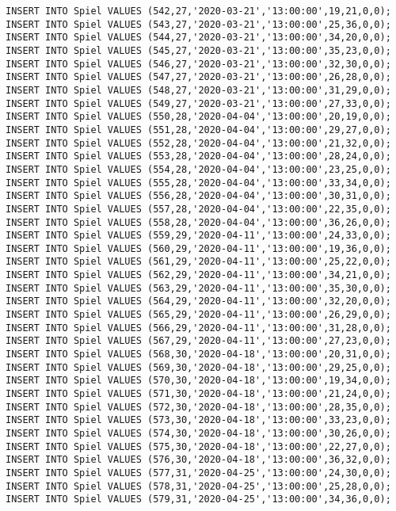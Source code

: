 \documentclass{bschlangaul-aufgabe}
\begin{document}
\begin{verbatim}
INSERT INTO Spiel VALUES (542,27,'2020-03-21','13:00:00',19,21,0,0);
INSERT INTO Spiel VALUES (543,27,'2020-03-21','13:00:00',25,36,0,0);
INSERT INTO Spiel VALUES (544,27,'2020-03-21','13:00:00',34,20,0,0);
INSERT INTO Spiel VALUES (545,27,'2020-03-21','13:00:00',35,23,0,0);
INSERT INTO Spiel VALUES (546,27,'2020-03-21','13:00:00',32,30,0,0);
INSERT INTO Spiel VALUES (547,27,'2020-03-21','13:00:00',26,28,0,0);
INSERT INTO Spiel VALUES (548,27,'2020-03-21','13:00:00',31,29,0,0);
INSERT INTO Spiel VALUES (549,27,'2020-03-21','13:00:00',27,33,0,0);
INSERT INTO Spiel VALUES (550,28,'2020-04-04','13:00:00',20,19,0,0);
INSERT INTO Spiel VALUES (551,28,'2020-04-04','13:00:00',29,27,0,0);
INSERT INTO Spiel VALUES (552,28,'2020-04-04','13:00:00',21,32,0,0);
INSERT INTO Spiel VALUES (553,28,'2020-04-04','13:00:00',28,24,0,0);
INSERT INTO Spiel VALUES (554,28,'2020-04-04','13:00:00',23,25,0,0);
INSERT INTO Spiel VALUES (555,28,'2020-04-04','13:00:00',33,34,0,0);
INSERT INTO Spiel VALUES (556,28,'2020-04-04','13:00:00',30,31,0,0);
INSERT INTO Spiel VALUES (557,28,'2020-04-04','13:00:00',22,35,0,0);
INSERT INTO Spiel VALUES (558,28,'2020-04-04','13:00:00',36,26,0,0);
INSERT INTO Spiel VALUES (559,29,'2020-04-11','13:00:00',24,33,0,0);
INSERT INTO Spiel VALUES (560,29,'2020-04-11','13:00:00',19,36,0,0);
INSERT INTO Spiel VALUES (561,29,'2020-04-11','13:00:00',25,22,0,0);
INSERT INTO Spiel VALUES (562,29,'2020-04-11','13:00:00',34,21,0,0);
INSERT INTO Spiel VALUES (563,29,'2020-04-11','13:00:00',35,30,0,0);
INSERT INTO Spiel VALUES (564,29,'2020-04-11','13:00:00',32,20,0,0);
INSERT INTO Spiel VALUES (565,29,'2020-04-11','13:00:00',26,29,0,0);
INSERT INTO Spiel VALUES (566,29,'2020-04-11','13:00:00',31,28,0,0);
INSERT INTO Spiel VALUES (567,29,'2020-04-11','13:00:00',27,23,0,0);
INSERT INTO Spiel VALUES (568,30,'2020-04-18','13:00:00',20,31,0,0);
INSERT INTO Spiel VALUES (569,30,'2020-04-18','13:00:00',29,25,0,0);
INSERT INTO Spiel VALUES (570,30,'2020-04-18','13:00:00',19,34,0,0);
INSERT INTO Spiel VALUES (571,30,'2020-04-18','13:00:00',21,24,0,0);
INSERT INTO Spiel VALUES (572,30,'2020-04-18','13:00:00',28,35,0,0);
INSERT INTO Spiel VALUES (573,30,'2020-04-18','13:00:00',33,23,0,0);
INSERT INTO Spiel VALUES (574,30,'2020-04-18','13:00:00',30,26,0,0);
INSERT INTO Spiel VALUES (575,30,'2020-04-18','13:00:00',22,27,0,0);
INSERT INTO Spiel VALUES (576,30,'2020-04-18','13:00:00',36,32,0,0);
INSERT INTO Spiel VALUES (577,31,'2020-04-25','13:00:00',24,30,0,0);
INSERT INTO Spiel VALUES (578,31,'2020-04-25','13:00:00',25,28,0,0);
INSERT INTO Spiel VALUES (579,31,'2020-04-25','13:00:00',34,36,0,0);

\end{verbatim}
\end{document}
